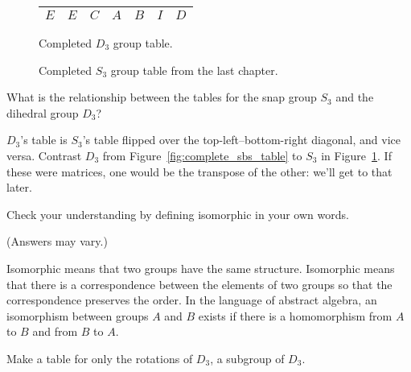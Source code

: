 \documentclass[../key.tex]{subfiles}
\begin{document}
\begin{figure}[h]
\begin{center}
\begin{minipage}[b]{0.45\textwidth}
\begin{tabular}{c|cccccc}
				$E$ & $E$ & $C$ & $A$ & $B$ & $I$ & $D$ \\ \hline
			\end{tabular}
			\vspace*{0.5\baselineskip}
		\end{minipage}
	\end{center}
	\vspace*{-2\baselineskip}
	\begin{center}
		\begin{minipage}[t]{0.45\textwidth}
			\caption{Completed $D_3$ group table.}
			\label{fig:complete_sbs_table}
		\end{minipage}
		\hfill
		\begin{minipage}[t]{0.45\textwidth}
			\caption{Completed $S_3$ group table from the last chapter.}
			\label{fig:complete_sts_table}
		\end{minipage}
	\end{center}
	\vspace*{-2\baselineskip}
\end{figure}

\begin{outer_problem}
\item What is the relationship between the tables for the snap group $S_3$ and the dihedral group $D_3$?
\end{outer_problem}

\noindent$D_3$'s table is $S_3$'s table flipped over the top-left--bottom-right diagonal, and vice versa. Contrast $D_3$ from Figure~\ref{fig:complete_sbs_table} to $S_3$ in Figure~\ref{fig:complete_sts_table}. If these were matrices, one would be the transpose of the other: we'll get to that later.

\begin{outer_problem}
\item Check your understanding by defining isomorphic in your own words.
\end{outer_problem}

\noindent (Answers may vary.)

Isomorphic means that two groups have the same structure.
Isomorphic means that there is a correspondence between the elements of two groups so that the correspondence preserves the order.
In the language of abstract algebra, an isomorphism between groups $A$ and $B$ exists if there is a homomorphism from $A$ to $B$ and from $B$ to $A$.


\begin{outer_problem}
\item
\begin{inner_problem}[start=1,leftmargin=25pt]
	\item Make a table for only the rotations of $D_3$, a subgroup of $D_3$.
\end{inner_problem}
\end{outer_problem}
\end{document}
